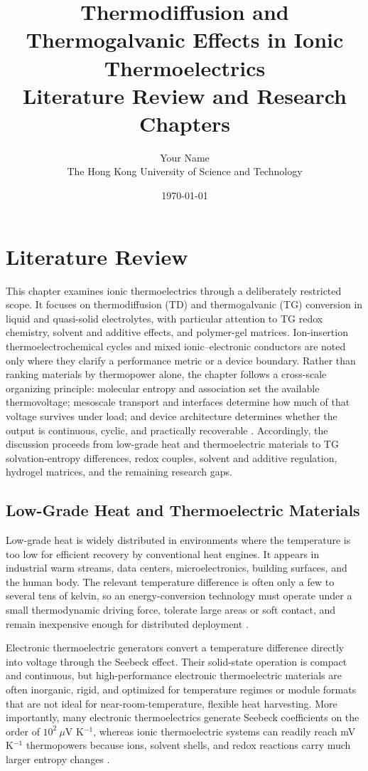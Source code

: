 \documentclass[a4paper,12pt]{report}
\title{\vspace{1.5cm}\textbf{\LARGE Thermodiffusion and Thermogalvanic Effects in Ionic Thermoelectrics}\\
\vspace{0.8cm}
\large Literature Review and Research Chapters}
\author{Your Name\\
The Hong Kong University of Science and Technology}
\date{\today}
\begin{document}
\maketitle
\thispagestyle{empty}
\newpage
\tableofcontents
\newpage

\chapter{Literature Review}

This chapter examines ionic thermoelectrics through a deliberately restricted
scope. It focuses on thermodiffusion (TD) and thermogalvanic (TG) conversion in
liquid and quasi-solid electrolytes, with particular attention to TG redox
chemistry, solvent and additive effects, and polymer-gel matrices. Ion-insertion
thermoelectrochemical cycles and mixed ionic--electronic conductors are noted
only where they clarify a performance metric or a device boundary. Rather than
ranking materials by thermopower alone, the chapter follows a cross-scale
organizing principle: molecular entropy and association set the available
thermovoltage; mesoscale transport and interfaces determine how much of that
voltage survives under load; and device architecture determines whether the
output is continuous, cyclic, and practically recoverable
\citep{jabeen2024recent,kim2026functional,shang2026pushing,xu2026birdseye}.
Accordingly, the discussion proceeds from low-grade heat and thermoelectric
materials to TG solvation-entropy differences, redox couples, solvent and
additive regulation, hydrogel matrices, and the remaining research gaps.

\section{Low-Grade Heat and Thermoelectric Materials}

Low-grade heat is widely distributed in environments where the temperature is
too low for efficient recovery by conventional heat engines. It appears in
industrial warm streams, data centers, microelectronics, building surfaces, and
the human body. The relevant temperature difference is often only a few to
several tens of kelvin, so an energy-conversion technology must operate under a
small thermodynamic driving force, tolerate large areas or soft contact, and
remain inexpensive enough for distributed deployment \citep{duan2021liquid,
liu2021wearable,shang2026pushing}.

Electronic thermoelectric generators convert a temperature difference directly
into voltage through the Seebeck effect. Their solid-state operation is compact
and continuous, but high-performance electronic thermoelectric materials are
often inorganic, rigid, and optimized for temperature regimes or module formats
that are not ideal for near-room-temperature, flexible heat harvesting. More
importantly, many electronic thermoelectrics generate Seebeck
coefficients on the order of $10^2\ \mu$V K$^{-1}$, whereas ionic
thermoelectric systems can readily reach mV K$^{-1}$ thermopowers because
ions, solvent shells, and redox reactions carry much larger entropy changes
\citep{duan2021liquid,jabeen2024recent,kim2026functional}.
\end{document}

